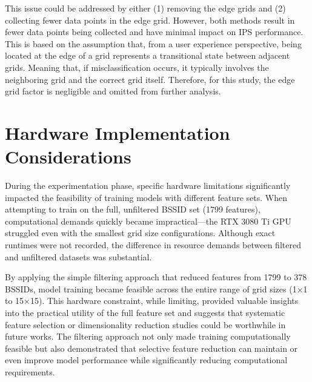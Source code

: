 \documentclass[runningheads]{llncs}
\begin{document}
This issue could be addressed by either (1) removing the edge grids and (2) collecting fewer data points in the edge grid. However, both methods result in fewer data points being collected and have minimal impact on IPS performance. This is based on the assumption that, from a user experience perspective, being located at the edge of a grid represents a transitional state between adjacent grids. Meaning that, if misclassification occurs, it typically involves the neighboring grid and the correct grid itself. Therefore, for this study, the edge grid factor is negligible and omitted from further analysis.

\section{Hardware Implementation Considerations}
During the experimentation phase, specific hardware limitations significantly impacted the feasibility of training models with different feature sets. When attempting to train on the full, unfiltered BSSID set (1799 features), computational demands quickly became impractical—the RTX 3080 Ti GPU struggled even with the smallest grid size configurations. Although exact runtimes were not recorded, the difference in resource demands between filtered and unfiltered datasets was substantial.

By applying the simple filtering approach that reduced features from 1799 to 378 BSSIDs, model training became feasible across the entire range of grid sizes (1×1 to 15×15). This hardware constraint, while limiting, provided valuable insights into the practical utility of the full feature set and suggests that systematic feature selection or dimensionality reduction studies could be worthwhile in future works. The filtering approach not only made training computationally feasible but also demonstrated that selective feature reduction can maintain or even improve model performance while significantly reducing computational requirements.
\end{document}
